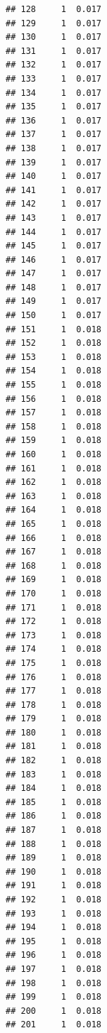 \documentclass[
  english,
  man]{apa6}
\begin{document}
\begin{verbatim}
## 128     1  0.017
## 129     1  0.017
## 130     1  0.017
## 131     1  0.017
## 132     1  0.017
## 133     1  0.017
## 134     1  0.017
## 135     1  0.017
## 136     1  0.017
## 137     1  0.017
## 138     1  0.017
## 139     1  0.017
## 140     1  0.017
## 141     1  0.017
## 142     1  0.017
## 143     1  0.017
## 144     1  0.017
## 145     1  0.017
## 146     1  0.017
## 147     1  0.017
## 148     1  0.017
## 149     1  0.017
## 150     1  0.017
## 151     1  0.018
## 152     1  0.018
## 153     1  0.018
## 154     1  0.018
## 155     1  0.018
## 156     1  0.018
## 157     1  0.018
## 158     1  0.018
## 159     1  0.018
## 160     1  0.018
## 161     1  0.018
## 162     1  0.018
## 163     1  0.018
## 164     1  0.018
## 165     1  0.018
## 166     1  0.018
## 167     1  0.018
## 168     1  0.018
## 169     1  0.018
## 170     1  0.018
## 171     1  0.018
## 172     1  0.018
## 173     1  0.018
## 174     1  0.018
## 175     1  0.018
## 176     1  0.018
## 177     1  0.018
## 178     1  0.018
## 179     1  0.018
## 180     1  0.018
## 181     1  0.018
## 182     1  0.018
## 183     1  0.018
## 184     1  0.018
## 185     1  0.018
## 186     1  0.018
## 187     1  0.018
## 188     1  0.018
## 189     1  0.018
## 190     1  0.018
## 191     1  0.018
## 192     1  0.018
## 193     1  0.018
## 194     1  0.018
## 195     1  0.018
## 196     1  0.018
## 197     1  0.018
## 198     1  0.018
## 199     1  0.018
## 200     1  0.018
## 201     1  0.018
\end{verbatim}
\end{document}
